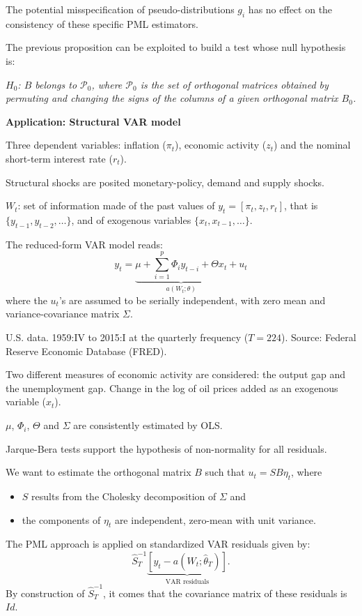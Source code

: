 \documentclass[
]{book}
\providecommand{\tightlist}{%
  \setlength{\itemsep}{0pt}\setlength{\parskip}{0pt}}
\theoremstyle{definition}
\theoremstyle{definition}
\theoremstyle{definition}
\theoremstyle{definition}
\theoremstyle{remark}
\begin{document}
The potential misspecification of pseudo-distributions \(g_i\) has no effect on the consistency of these specific PML estimators.

The previous proposition can be exploited to build a test whose null hypothesis is:

\emph{\(H_0\): \(B\) belongs to \(\mathcal{P}_0\), where \(\mathcal{P}_0\) is the set of orthogonal matrices obtained by permuting and changing the signs of the columns of a given orthogonal matrix \(B_0\).}

\textbf{Application: Structural VAR model}

Three dependent variables: inflation (\(\pi_t\)), economic activity (\(z_t\)) and the nominal short-term interest rate (\(r_t\)).

Structural shocks are posited monetary-policy, demand and supply shocks.

\(W_t\): set of information made of the past values of \(y_t= [\pi_t,z_t,r_t]\), that is \(\{y_{t-1},y_{t-2},\dots\}\), and of exogenous variables \(\{x_{t},x_{t-1},\dots\}\).

The reduced-form VAR model reads:
\[
y_t  = \underbrace{\mu + \sum_{i=1}^{p} \Phi_i y_{t-i} + \Theta x_t}_{a(W_t;\theta)} + u_t
\]
where the \(u_t\)'s are assumed to be serially independent, with zero mean and variance-covariance matrix \(\Sigma\).

U.S. data. 1959:IV to 2015:I at the quarterly frequency (\(T=224\)). Source: Federal Reserve Economic Database (FRED).

Two different measures of economic activity are considered: the output gap and the unemployment gap. Change in the log of oil prices added as an exogenous variable (\(x_t\)).

\(\mu\), \(\Phi_i\), \(\Theta\) and \(\Sigma\) are consistently estimated by OLS.

Jarque-Bera tests support the hypothesis of non-normality for all residuals.

We want to estimate the orthogonal matrix \(B\) such that \(u_t=SB \eta_t\), where

\begin{itemize}
\tightlist
\item
  \(S\) results from the Cholesky decomposition of \(\Sigma\) and
\item
  the components of \(\eta_t\) are independent, zero-mean with unit variance.
\end{itemize}

The PML approach is applied on standardized VAR residuals given by:
\[
\hat{S}_T^{-1}\underbrace{[y_t - a(W_t;\hat\theta_T)]}_{\mbox{VAR residuals}}.
\]
By construction of \(\hat{S}_T^{-1}\), it comes that the covariance matrix of these residuals is \(Id\).
\end{document}
